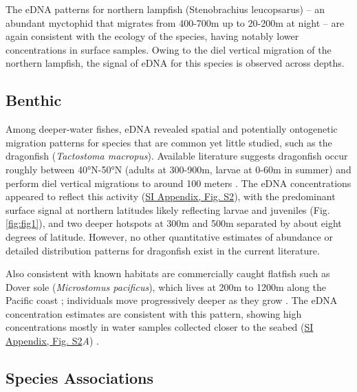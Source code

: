 \documentclass[9pt,twocolumn,twoside]{pnas-new}
\begin{document}
The eDNA patterns for northern lampfish (Stenobrachius leucopsarus) -- an abundant myctophid that migrates from 400-700m up to 20-200m at night \cite{moku2000,suntsov2008} -- are again consistent with the ecology of the species, having notably lower concentrations in surface samples. Owing to the diel vertical migration of the northern lampfish, the signal of eDNA for this species is observed across depths.

\subsection*{Benthic}
Among deeper-water fishes, eDNA revealed spatial and potentially ontogenetic migration patterns for species that are common yet little studied, such as the dragonfish (\textit{Tactostoma macropus}). Available literature suggests dragonfish occur roughly between 40°N-50°N (adults at 300-900m, larvae at 0-60m in summer) \cite{kawaguchi1993} and perform diel vertical migrations to around 100 meters \cite{kawaguchi1993,willis1982}. The eDNA concentrations appeared to reflect this activity (\href{SI_Appendix.pdf}{SI Appendix, Fig. S2}), with the predominant surface signal at northern latitudes likely reflecting larvae and juveniles (Fig. \ref{fig:fig1}), and two deeper hotspots at 300m and 500m separated by about eight degrees of latitude. However, no other quantitative estimates of abundance or detailed distribution patterns for dragonfish exist in the current literature.

Also consistent with known habitats are commercially caught flatfish such as Dover sole (\textit{Microstomus pacificus}), which lives at 200m to 1200m along the Pacific coast \cite{drazen2007,brodziak2000,drazen2012}; individuals move progressively deeper as they grow \cite{vetter1994,hunter1990}. The eDNA concentration estimates are consistent with this pattern, showing high concentrations mostly in water samples collected closer to the seabed (\href{SI_Appendix.pdf}{SI Appendix, Fig. S2}\textit{A}) \cite{ono2016}.

\subsection*{Species Associations}
\end{document}
